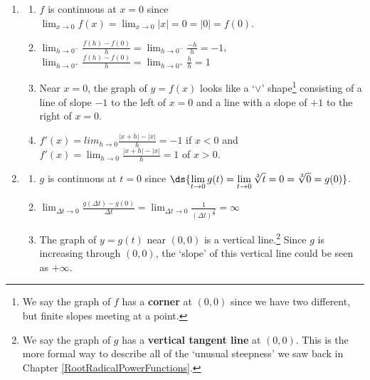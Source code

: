 \documentclass{ximera}
\begin{document}
\begin{enumerate}
\setcounter{enumi}{\value{HW}}

\item \begin{enumerate} \item  $f$ is continuous at $x=0$ since $\lim_{x \rightarrow 0} f(x) = \lim_{x \rightarrow 0} |x| = 0 = |0| = f(0)$.

\smallskip

\item   $\lim_{h \rightarrow 0^{-}} \frac{f(h) - f(0)}{h} = \lim_{h \rightarrow 0^{-}} \frac{-h}{h}  =-1$,  $\lim_{h \rightarrow 0^{+}} \frac{f(h) - f(0)}{h} = \lim_{h \rightarrow 0^{+}} \frac{h}{h}  = 1$

\smallskip
        
\item  Near $x = 0$, the graph of $y = f(x)$ looks like a `$\vee$' shape\footnote{We say the graph of $f$ has a  \textbf{corner} at $(0,0)$ since we have two different, but finite slopes meeting at a point.} consisting of a line of slope $-1$ to the left of $x=0$ and a line with a slope of $+1$ to the right of $x = 0$.

\smallskip

\item  $f'(x) =  lim_{h \rightarrow 0} \frac{|x+h| - |x|}{h} = -1$ if $x < 0$ and $f'(x) =  \lim_{h \rightarrow 0} \frac{|x+h| - |x|}{h} = 1$ of $x > 0$.

\smallskip

\end{enumerate}



\item \begin{enumerate}

\item  $g$ is continuous at $t=0$ since $\ds{\lim_{t \rightarrow 0} g(t) = \lim_{t \rightarrow 0} \sqrt[3]{t} = 0 = \sqrt[3]{0} = g(0)}$.

\smallskip

\item $\lim_{\Delta t \rightarrow 0} \frac{g(\Delta t) - g(0)}{\Delta t} =   \lim_{\Delta t \rightarrow 0} \frac{1}{(\Delta t)^{\frac{2}{3}}}   =  \infty$

\smallskip

        
\item  The graph of $y = g(t)$ near $(0,0)$ is a vertical line.\footnote{We say the graph of $g$ has a  \textbf{vertical tangent line} at $(0,0)$.  This is the more formal way to describe all of the `unusual steepness' we saw back in Chapter \ref{RootRadicalPowerFunctions}.}  Since $g$ is increasing through $(0,0)$, the `slope' of this vertical line could be seen as $+ \infty$. 


\end{enumerate}
\end{enumerate}
\end{document}
